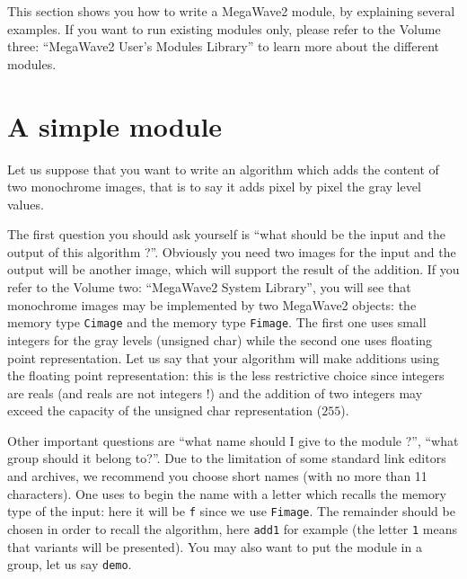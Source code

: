 %
%

This section shows you how to write a MegaWave2 module, by explaining several examples.
If you want to run existing modules only, please refer to the Volume three: ``MegaWave2 User's Modules Library'' to learn more about the different modules.

\section{A simple module}
\label{start_simple}

Let us suppose that you want to write an algorithm which adds the content of
two monochrome images, that is to say it adds pixel by pixel the gray level values.

The first question you should ask yourself is ``what should be the input and the output of this algorithm ?''.
Obviously you need two images for the input and the output will be another image, which will support the result of the addition.
If you refer to the Volume two: ``MegaWave2 System Library'', you will see
that monochrome images may be implemented by two MegaWave2 objects: the
memory type \verb+Cimage+ and the memory type \verb+Fimage+.
The first one uses small integers for the gray levels (unsigned char) while the second one uses floating point representation.
Let us say that your algorithm will make additions using the floating point representation: this is the less restrictive choice since integers are reals (and reals are not integers !) and the addition of two integers may exceed the capacity of the unsigned char representation ($255$).

Other important questions are ``what name should I give to the module ?'', ``what group should it belong to?''.
Due to the limitation of some standard link editors and archives, we recommend
you choose short names (with no more than 11 characters).
One uses to begin the name with a letter which recalls the memory type of the input: here it will be \verb+f+ since we use \verb+Fimage+.
The remainder should be chosen in order to recall the algorithm, here \verb+add1+ for example (the letter \verb+1+ means that variants will be presented).
You may also want to put the module in a group, let us say \verb+demo+.

